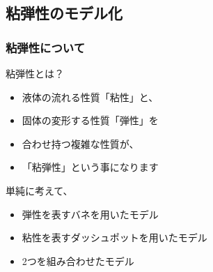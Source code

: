 \documentclass[12pt, dvipdfmx]{beamer}
\begin{document}
\subsection{粘弾性のモデル化}
\begin{frame}
	\frametitle{粘弾性について}
		\begin{block}{粘弾性とは？}
			\begin{itemize}
				\item 液体の流れる性質「粘性」と、
				\item 固体の変形する性質「弾性」を
				\item 合わせ持つ複雑な性質が、
				\item 「粘弾性」という事になります
			\end{itemize}
		\end{block}
		\begin{exampleblock}{単純に考えて、}
			\begin{itemize}
				\item 弾性を表すバネを用いたモデル
				\item 粘性を表すダッシュポットを用いたモデル
				\item 2つを組み合わせたモデル
			\end{itemize}
		\end{exampleblock}
\end{frame}
\end{document}
